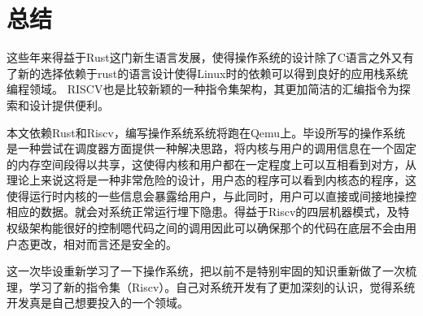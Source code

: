 \chapter{总结}
\label{chap:Summary}

这些年来得益于Rust这门新生语言发展，使得操作系统的设计除了C语言之外又有了新的选择依赖于rust的语言设计使得Linux时的依赖可以得到良好的应用栈系统编程领域。 RISCV也是比较新颖的一种指令集架构，其更加简洁的汇编指令为探索和设计提供便利。

本文依赖Rust和Riscv，编写操作系统系统将跑在Qemu上。毕设所写的操作系统是一种尝试在调度器方面提供一种解决思路，将内核与用户的调用信息在一个固定的内存空间段得以共享，这使得内核和用户都在一定程度上可以互相看到对方，从理论上来说这将是一种非常危险的设计，用户态的程序可以看到内核态的程序，这使得运行时内核的一些信息会暴露给用户，与此同时，用户可以直接或间接地操控相应的数据。就会对系统正常运行埋下隐患。得益于Riscv的四层机器模式，及特权级架构能很好的控制嗯代码之间的调用因此可以确保那个的代码在底层不会由用户态更改，相对而言还是安全的。

这一次毕设重新学习了一下操作系统，把以前不是特别牢固的知识重新做了一次梳理，学习了新的指令集（Riscv）。自己对系统开发有了更加深刻的认识，觉得系统开发真是自己想要投入的一个领域。
